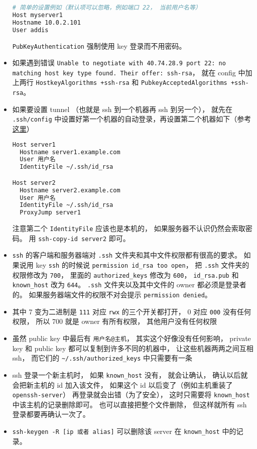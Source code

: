 \begin{itemize}
\begin{lstlisting}[language=bash]
# 简单的设置例如（默认项可以忽略，例如端口 22， 当前用户名等）
Host myserver1
Hostname 10.0.2.101
User addis
\end{lstlisting}
\verb|PubKeyAuthentication| 强制使用 key 登录而不用密码。

\item 如果遇到错误 \verb|Unable to negotiate with 40.74.28.9 port 22: no matching host key type found. Their offer: ssh-rsa|， 就在 config 中加上两行 \verb|HostkeyAlgorithms +ssh-rsa| 和 \verb|PubkeyAcceptedAlgorithms +ssh-rsa|。

\item 如果要设置 tunnel （也就是 ssh 到一个机器再 ssh 到另一个）， 就先在 \verb|.ssh/config| 中设置好第一个机器的自动登录，再设置第二个机器如下（参考\href{https://askubuntu.com/questions/311447/how-do-i-ssh-to-machine-a-via-b-in-one-command}{这里}）
\begin{lstlisting}[language=bash]
Host server1
  Hostname server1.example.com
  User 用户名
  IdentityFile ~/.ssh/id_rsa

Host server2
  Hostname server2.example.com
  User 用户名
  IdentityFile ~/.ssh/id_rsa
  ProxyJump server1
\end{lstlisting}
注意第二个 \verb|IdentityFile| 应该也是本机的， 如果服务器不认识仍然会索取密码。 用 \verb|ssh-copy-id server2| 即可。

\item \verb|ssh| 的客户端和服务器端对 \verb|.ssh| 文件夹和其中文件权限都有很高的要求。 如果说用 key \verb`ssh` 的时候说 \verb`permission id_rsa too open`， 把 \verb|.ssh| 文件夹的权限修改为 \verb|700|， 里面的 \verb|authorized_keys| 修改为 \verb|600|， \verb|id_rsa.pub| 和 \verb|known_host| 改为 \verb|644|。 \verb|.ssh| 文件夹以及其中文件的 owner 都必须是登录者的。 如果服务器端文件的权限不对会提示 \verb|permission denied|。
\item 其中 7 变为二进制是 \verb`111` 对应 \verb`rwx` 的三个开关都打开， 0 对应 \verb`000` 没有任何权限， 所以 700 就是 owner 有所有权限， 其他用户没有任何权限
\item 虽然 public key 中最后有 \verb`用户名@主机`， 其实这个好像没有任何影响， private key 和 public key 都可以复制到许多不同的机器中， 让这些机器两两之间互相 ssh， 而它们的 \verb`~/.ssh/authorized_keys` 中只需要有一条
\item ssh 登录一个新主机时， 如果 \verb`known_host` 没有， 就会让确认， 确认以后就会把新主机的 id 加入该文件， 如果这个 id 以后变了（例如主机重装了 \verb`openssh-server`） 再登录就会出错（为了安全）， 这时只需要将 \verb`known_host` 中该主机的记录删除即可。 也可以直接把整个文件删除， 但这样就所有 ssh 登录都要再确认一次了。
\item \verb|ssh-keygen -R [ip 或者 alias]| 可以删除该 server 在 \verb|known_host| 中的记录。
\end{itemize}

